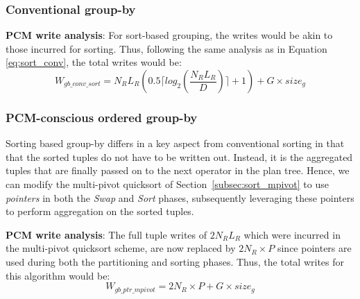 \subsubsection{Conventional group-by}
\textbf{PCM write analysis}: For sort-based grouping, the writes would
be akin to those incurred for sorting. Thus, following the same analysis
as in Equation \ref{eq:sort_conv}, the total writes would be:
\begin{equation}
\label{eq:gby_conv_sort}
W_{gb\_conv\_sort} = N_RL_R (0.5 \lceil log_2(\frac{N_R L_R}{D}) \rceil + 1) + G \times size_g
\end{equation}	


\subsubsection{PCM-conscious ordered group-by}
\label{subsec:gb_ptr_mpivot} 
Sorting based group-by differs in a key aspect from conventional sorting
in that that the sorted tuples do not have to be written out. Instead, it
is the aggregated tuples that are finally passed on to the next operator
in the plan tree. Hence, we can modify the multi-pivot quicksort of
Section~\ref{subsec:sort_mpivot} to use \emph{pointers} in both the
\textit{Swap} and \textit{Sort} phases, subsequently leveraging these
pointers to perform aggregation on the sorted tuples.

\textbf{PCM write analysis}: The full tuple writes of $2 N_R L_R$
which were incurred in the multi-pivot quicksort scheme, are
now replaced by $2N_R \times P$ since pointers are used during
both the partitioning and sorting phases. Thus, the total writes for this
algorithm would be:
\begin{equation}
\label{eq:gby_ptr_mpivot}
W_{gb\_ptr\_mpivot} = 2N_R \times P + G \times size_g
\end{equation}

